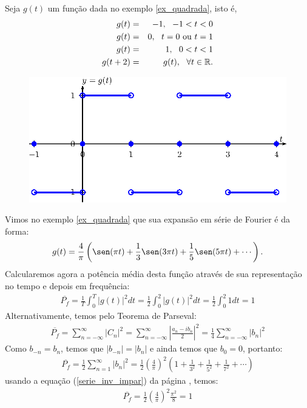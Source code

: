 \begin{ex}\label{ex_quadrada_parseval} Seja $g(t)$ um função dada no exemplo \ref{ex_quadrada}, isto é,
\begin{eqnarray*}
g(t)&=&-1, \ \ -1< t<0\\
g(t)&=&0, \ \ t=0\ \hbox{ou}\ t=1\\
g(t)&=&1, \ \ 0< t<1\\
g(t+2)&=&g(t),\ \ \forall t\in\mathbb{R}.
\end{eqnarray*}
\begin{figure}[!ht]
\begin{center}
\includegraphics{cap_propriedades_series/pics/figura_1}\end{center}
\end{figure}
Vimos no exemplo \ref{ex_quadrada} que sua expansão em série de Fourier é da forma:
\begin{equation}
g(t)=\frac{4}{\pi}\left(\sen(\pi t)+\frac{1}{3}\sen(3\pi t)+\frac{1}{5}\sen(5\pi t)+\cdots\right).
\end{equation}
Calcularemos agora a potência média desta função através de sua representação no tempo e depois em frequência:
\begin{eqnarray*}
 \overline{P_f}=\frac{1}{T}\int_0^T |g(t)|^2dt=\frac{1}{2}\int_0^2 |g(t)|^2dt=\frac{1}{2}\int_0^2 1dt=1
\end{eqnarray*}
Alternativamente, temos pelo Teorema de Parseval:
\begin{eqnarray*}
 \overline{P_f}=\sum_{n=-\infty}^\infty |C_n|^2=\sum_{n=-\infty}^\infty \left|\frac{a_n-ib_n}{2}\right|^2=\frac{1}{4}\sum_{n=-\infty}^\infty |b_n|^2
\end{eqnarray*}
Como $b_{-n}=b_n$, temos que $|b_{-n}|=|b_n|$ e ainda temos que $b_0=0$, portanto: 
\begin{eqnarray*}
 \overline{P_f}=\frac{1}{2}\sum_{n=1}^\infty |b_n|^2 = \frac{1}{2}\left(\frac{4}{\pi}\right)^2\left(1 + \frac{1}{3^2}+ \frac{1}{5^2}+ \frac{1}{7^2}+\cdots\right)
\end{eqnarray*}
usando a equação (\ref{serie_inv_impar}) da página \pageref{serie_inv_impar}, temos:
\begin{eqnarray*}
 \overline{P_f}=\frac{1}{2}\left(\frac{4}{\pi}\right)^2\frac{\pi^2}{8}=1
\end{eqnarray*}
\end{ex}

